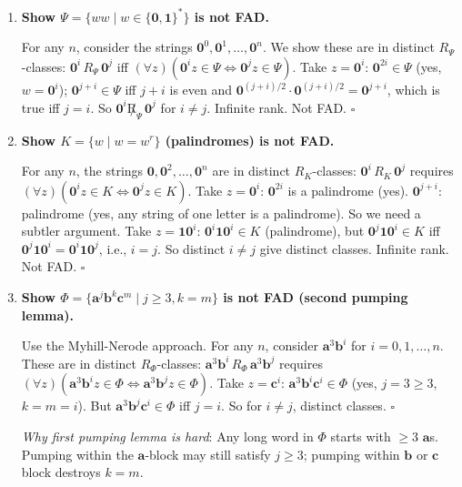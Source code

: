 \begin{enumerate}[{2.}1.]
\item \textbf{Show $\Psi=\{ww\mid w\in\{\mathbf{0},\mathbf{1}\}^*\}$ is not FAD.}

For any $n$, consider the strings $\mathbf{0}^0,\mathbf{0}^1,\ldots,\mathbf{0}^n$. We show these are in distinct $R_\Psi$-classes: $\mathbf{0}^i\,R_\Psi\,\mathbf{0}^j$ iff $(\forall z)(\mathbf{0}^iz\in\Psi\Leftrightarrow\mathbf{0}^jz\in\Psi)$. Take $z=\mathbf{0}^i$: $\mathbf{0}^{2i}\in\Psi$ (yes, $w=\mathbf{0}^i$); $\mathbf{0}^{j+i}\in\Psi$ iff $j+i$ is even and $\mathbf{0}^{(j+i)/2}\cdot\mathbf{0}^{(j+i)/2}=\mathbf{0}^{j+i}$, which is true iff $j=i$. So $\mathbf{0}^i\not R_\Psi\,\mathbf{0}^j$ for $i\neq j$. Infinite rank. Not FAD. $\square$

\item \textbf{Show $K=\{w\mid w=w^r\}$ (palindromes) is not FAD.}

For any $n$, the strings $\mathbf{0},\mathbf{0}^2,\ldots,\mathbf{0}^n$ are in distinct $R_K$-classes: $\mathbf{0}^i\,R_K\,\mathbf{0}^j$ requires $(\forall z)(\mathbf{0}^iz\in K\Leftrightarrow\mathbf{0}^jz\in K)$. Take $z=\mathbf{0}^i$: $\mathbf{0}^{2i}$ is a palindrome (yes). $\mathbf{0}^{j+i}$: palindrome (yes, any string of one letter is a palindrome). So we need a subtler argument. Take $z=\mathbf{1}\mathbf{0}^i$: $\mathbf{0}^i\mathbf{1}\mathbf{0}^i\in K$ (palindrome), but $\mathbf{0}^j\mathbf{1}\mathbf{0}^i\in K$ iff $\mathbf{0}^j\mathbf{1}\mathbf{0}^i=\mathbf{0}^i\mathbf{1}\mathbf{0}^j$, i.e., $i=j$. So distinct $i\neq j$ give distinct classes. Infinite rank. Not FAD. $\square$

\item \textbf{Show $\Phi=\{\mathbf{a}^j\mathbf{b}^k\mathbf{c}^m\mid j\geq 3,k=m\}$ is not FAD (second pumping lemma).}

Use the Myhill-Nerode approach. For any $n$, consider $\mathbf{a}^3\mathbf{b}^i$ for $i=0,1,\ldots,n$. These are in distinct $R_\Phi$-classes: $\mathbf{a}^3\mathbf{b}^i\,R_\Phi\,\mathbf{a}^3\mathbf{b}^j$ requires $(\forall z)(\mathbf{a}^3\mathbf{b}^iz\in\Phi\Leftrightarrow\mathbf{a}^3\mathbf{b}^jz\in\Phi)$. Take $z=\mathbf{c}^i$: $\mathbf{a}^3\mathbf{b}^i\mathbf{c}^i\in\Phi$ (yes, $j=3\geq 3$, $k=m=i$). But $\mathbf{a}^3\mathbf{b}^j\mathbf{c}^i\in\Phi$ iff $j=i$. So for $i\neq j$, distinct classes. $\square$

\textit{Why first pumping lemma is hard}: Any long word in $\Phi$ starts with $\geq 3$ $\mathbf{a}$s. Pumping within the $\mathbf{a}$-block may still satisfy $j\geq 3$; pumping within $\mathbf{b}$ or $\mathbf{c}$ block destroys $k=m$.


\end{enumerate}
